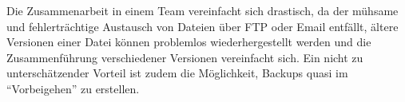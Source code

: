 Die Zusammenarbeit in einem Team vereinfacht sich drastisch, da der mühsame und fehlerträchtige Austausch von Dateien über FTP oder Email entfällt, ältere Versionen einer Datei können problemlos wiederhergestellt werden und die Zusammenführung verschiedener Versionen vereinfacht sich. Ein nicht zu unterschätzender Vorteil ist zudem die Möglichkeit, Backups quasi im \enquote{Vorbeigehen} zu erstellen.

